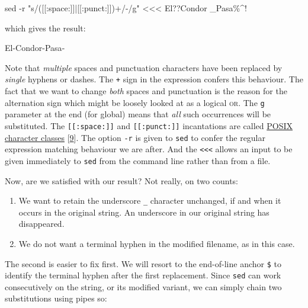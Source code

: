 \documentclass[
  a4paper,
]{article}
\newenvironment{Shaded}{\begin{snugshade}}{\end{snugshade}}
\newcommand{\AttributeTok}[1]{\textcolor[rgb]{0.80,0.80,0.80}{#1}}
\newcommand{\FunctionTok}[1]{\textcolor[rgb]{0.94,0.94,0.56}{#1}}
\newcommand{\NormalTok}[1]{\textcolor[rgb]{0.80,0.80,0.80}{#1}}
\newcommand{\OperatorTok}[1]{\textcolor[rgb]{0.94,0.94,0.82}{#1}}
\newcommand{\StringTok}[1]{\textcolor[rgb]{0.80,0.58,0.58}{#1}}
\providecommand{\tightlist}{%
  \setlength{\itemsep}{0pt}\setlength{\parskip}{0pt}}
\begin{document}
\begin{Shaded}
\begin{Highlighting}[]
\FunctionTok{sed} \AttributeTok{{-}r} \StringTok{"s/([[:space:]]|[[:punct:]])+/{-}/g"} \OperatorTok{\textless{}\textless{}\textless{}} \StringTok{\textquotesingle{}El??Condor   \_Pasa\%\^{}!\textquotesingle{}}
\end{Highlighting}
\end{Shaded}

which gives the result:

\begin{Shaded}
\begin{Highlighting}[]
\NormalTok{El{-}Condor{-}Pasa{-}}
\end{Highlighting}
\end{Shaded}

Note that \emph{multiple} spaces and punctuation characters have been
replaced by \emph{single} hyphens or dashes. The \texttt{+} sign in the
expression confers this behaviour. The fact that we want to change
\emph{both} spaces and punctuation is the reason for the
\texttt{\textbar{}} alternation sign which might be loosely looked at as
a logical \textsc{or}. The \texttt{g} parameter at the end (for global)
means that \emph{all} such occurrences will be substituted. The
\texttt{{[}{[}:space:{]}{]}} and \texttt{{[}{[}:punct:{]}{]}}
incantations are called
\href{https://www.regular-expressions.info/posixbrackets.html}{POSIX
character classes} {[}\protect\hyperlink{ref-posixcharclass}{9}{]}. The
option \texttt{-r} is given to \texttt{sed} to confer the regular
expression matching behaviour we are after. And the
\texttt{\textless{}\textless{}\textless{}} allows an input to be given
immediately to \texttt{sed} from the command line rather than from a
file.

Now, are we satisfied with our result? Not really, on two counts:

\begin{enumerate}
\tightlist
\item
  We want to retain the underscore \texttt{\_} character unchanged, if
  and when it occurs in the original string. An underscore in our
  original string has disappeared.
\item
  We do not want a terminal hyphen in the modified filename, as in this
  case.
\end{enumerate}

The second is easier to fix first. We will resort to the end-of-line
anchor \texttt{\$} to identify the terminal hyphen after the first
replacement. Since \texttt{sed} can work consecutively on the string, or
its modified variant, we can simply chain two substitutions using pipes
so:
\end{document}
